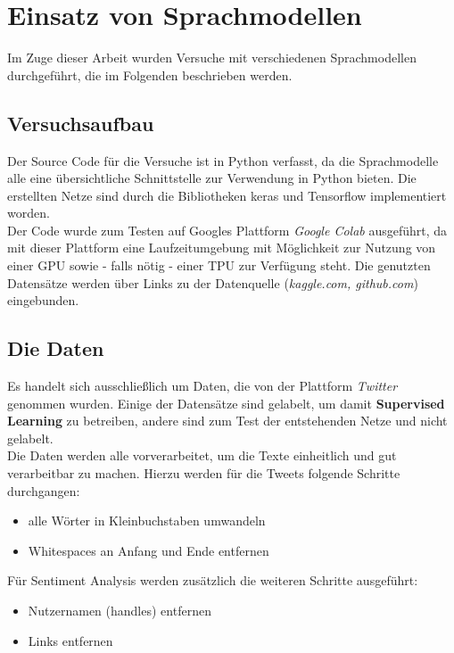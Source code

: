 \chapter{Einsatz von Sprachmodellen}
Im Zuge dieser Arbeit wurden Versuche mit verschiedenen Sprachmodellen durchgef\"uhrt, die im Folgenden beschrieben werden.

\section{Versuchsaufbau}
Der Source Code f\"ur die Versuche ist in Python verfasst, da die Sprachmodelle alle eine \"ubersichtliche Schnittstelle zur Verwendung in Python bieten. Die erstellten Netze sind durch die Bibliotheken keras \cite{keras} und Tensorflow \cite{tensorflow} implementiert worden. \\
Der Code wurde zum Testen auf Googles Plattform \textit{Google Colab} \cite{colab} ausgef\"uhrt, da mit dieser Plattform eine Laufzeitumgebung mit M\"oglichkeit zur Nutzung von einer GPU sowie - falls n\"otig - einer TPU zur Verf\"ugung steht. Die genutzten Datens\"atze werden \"uber Links zu der Datenquelle (\textit{kaggle.com, github.com}) eingebunden.


\section{Die Daten}
Es handelt sich ausschlie{\ss}lich um Daten, die von der Plattform \textit{Twitter} genommen wurden. Einige der Datens\"atze sind gelabelt, um damit \textbf{Supervised Learning} zu betreiben, andere sind zum Test der entstehenden Netze und nicht gelabelt.\\
Die Daten werden alle vorverarbeitet, um die Texte einheitlich und gut verarbeitbar zu machen. Hierzu werden f\"ur die Tweets folgende Schritte durchgangen:
\begin{itemize}
\item alle W\"orter in Kleinbuchstaben umwandeln
\item Whitespaces an Anfang und Ende entfernen

\end{itemize}
F\"ur Sentiment Analysis werden zus\"atzlich die weiteren Schritte ausgef\"uhrt:
\begin{itemize}
\item Nutzernamen (handles) entfernen
\item Links entfernen 
\end{itemize}

